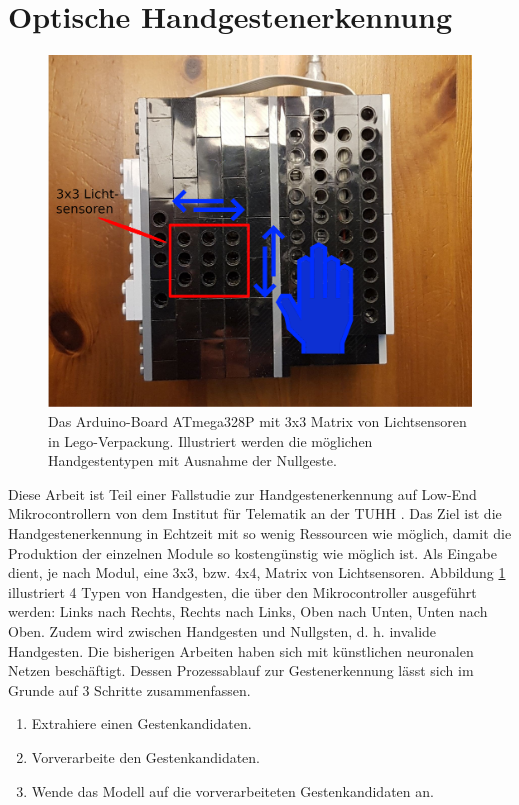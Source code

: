 \section{Optische Handgestenerkennung}
\label{sec:fallstudie}
\begin{figure}
    \centering
    \includegraphics[width=0.6\linewidth]{images/arduino_ex.png}
    \caption{Das Arduino-Board ATmega328P mit 3x3 Matrix von Lichtsensoren in Lego-Verpackung. Illustriert werden die möglichen Handgestentypen mit Ausnahme der Nullgeste.}
    \label{fig:arduino_ex}
\end{figure}
Diese Arbeit ist Teil einer Fallstudie zur Handgestenerkennung auf Low-End Mikrocontrollern von dem Institut für Telematik an der TUHH \cite{venzkeArticle}. Das Ziel ist die Handgestenerkennung in Echtzeit mit so wenig
Ressourcen wie möglich, damit die Produktion der einzelnen Module so kostengünstig wie möglich ist. Als Eingabe dient, je nach Modul, eine 3x3, bzw. 4x4, Matrix von Lichtsensoren. Abbildung \ref{fig:arduino_ex}
illustriert 4 Typen von Handgesten, die über den Mikrocontroller ausgeführt werden: Links nach Rechts, Rechts nach Links, Oben nach Unten, Unten nach Oben. Zudem wird zwischen Handgesten und Nullgsten, d. h.
invalide Handgesten. Die bisherigen Arbeiten haben sich mit künstlichen neuronalen Netzen beschäftigt. Dessen Prozessablauf zur Gestenerkennung lässt sich im Grunde auf 3 Schritte zusammenfassen.
\begin{enumerate}
    \item Extrahiere einen Gestenkandidaten.
    \item Vorverarbeite den Gestenkandidaten.
    \item Wende das Modell auf die vorverarbeiteten Gestenkandidaten an.
\end{enumerate}





